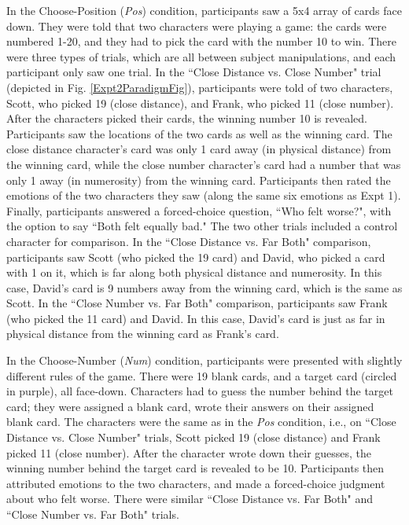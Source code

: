 \documentclass[10pt,letterpaper]{article}
\begin{document}
In the Choose-Position (\textit{Pos}) condition, participants saw a 5x4 array of cards face down. They were told that two characters were playing a game: the cards were numbered 1-20, and they had to pick the card with the number 10 to win. There were three types of trials, which are all between subject manipulations, and each participant only saw one trial. In the ``Close Distance vs. Close Number" trial (depicted in Fig. \ref{Expt2ParadigmFig}), participants were told of two characters, Scott, who picked 19 (close distance), and Frank, who picked 11 (close number). After the characters picked their cards, the winning number 10 is revealed. Participants saw the locations of the two cards as well as the winning card. The close distance character's card was only 1 card away (in physical distance) from the winning card, while the close number character's card had a number that was only 1 away (in numerosity) from the winning card. Participants then rated the emotions of the two characters they saw (along the same six emotions as Expt 1). Finally, participants answered a forced-choice question, ``Who felt worse?", with the option to say ``Both felt equally bad."
The two other trials included a control character for comparison. In the ``Close Distance vs. Far Both" comparison, participants saw Scott (who picked the 19 card) and David, who picked a card with 1 on it, which is far along both physical distance and numerosity. In this case, David's card is 9 numbers away from the winning card, which is the same as Scott. In the ``Close Number vs. Far Both" comparison, participants saw Frank (who picked the 11 card) and David. In this case, David's card is just as far in physical distance from the winning card as Frank's card.


In the Choose-Number (\textit{Num}) condition, participants were presented with slightly different rules of the game. There were 19 blank cards, and a target card (circled in purple), all face-down. Characters had to guess the number behind the target card; they were assigned a blank card, wrote their answers on their assigned blank card. The characters were the same as in the \textit{Pos} condition, i.e., on ``Close Distance vs. Close Number" trials, Scott picked 19 (close distance) and Frank picked 11 (close number). After the character wrote down their guesses, the winning number behind the target card is revealed to be 10. Participants then attributed emotions to the two characters, and made a forced-choice judgment about who felt worse. There were similar ``Close Distance vs. Far Both" and ``Close Number vs. Far Both" trials.
\end{document}
